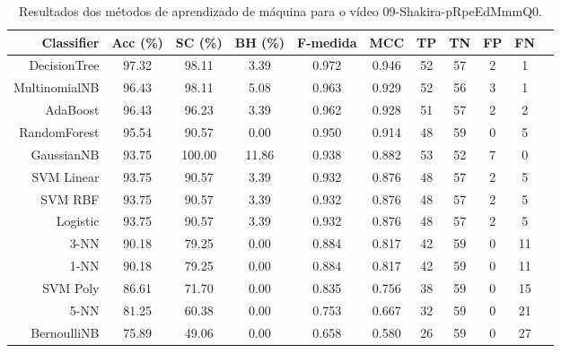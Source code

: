 \begin{table}[!htb]
\centering
\caption{Resultados dos métodos de aprendizado de máquina para o vídeo 09-Shakira-pRpeEdMmmQ0.}
\label{tab:09-Shakira-pRpeEdMmmQ0}
\begin{tabular}{r|c|c|c|c|c|c|c|c|c|c}
\hline\hline
Classifier & Acc (\%) & SC (\%) & BH (\%) & F-medida & MCC & TP & TN & FP & FN \\ \hline
DecisionTree & 97.32 & 98.11 & 3.39 & 0.972 & 0.946 & 52 & 57 & 2 & 1 \\ 
MultinomialNB & 96.43 & 98.11 & 5.08 & 0.963 & 0.929 & 52 & 56 & 3 & 1 \\ 
AdaBoost & 96.43 & 96.23 & 3.39 & 0.962 & 0.928 & 51 & 57 & 2 & 2 \\ 
RandomForest & 95.54 & 90.57 & 0.00 & 0.950 & 0.914 & 48 & 59 & 0 & 5 \\ 
GaussianNB & 93.75 & 100.00 & 11.86 & 0.938 & 0.882 & 53 & 52 & 7 & 0 \\ 
SVM Linear & 93.75 & 90.57 & 3.39 & 0.932 & 0.876 & 48 & 57 & 2 & 5 \\ 
SVM RBF & 93.75 & 90.57 & 3.39 & 0.932 & 0.876 & 48 & 57 & 2 & 5 \\ 
Logistic & 93.75 & 90.57 & 3.39 & 0.932 & 0.876 & 48 & 57 & 2 & 5 \\ 
3-NN & 90.18 & 79.25 & 0.00 & 0.884 & 0.817 & 42 & 59 & 0 & 11 \\ 
1-NN & 90.18 & 79.25 & 0.00 & 0.884 & 0.817 & 42 & 59 & 0 & 11 \\ 
SVM Poly & 86.61 & 71.70 & 0.00 & 0.835 & 0.756 & 38 & 59 & 0 & 15 \\ 
5-NN & 81.25 & 60.38 & 0.00 & 0.753 & 0.667 & 32 & 59 & 0 & 21 \\ 
BernoulliNB & 75.89 & 49.06 & 0.00 & 0.658 & 0.580 & 26 & 59 & 0 & 27 \\ 
\hline\hline
\end{tabular}
\end{table}
